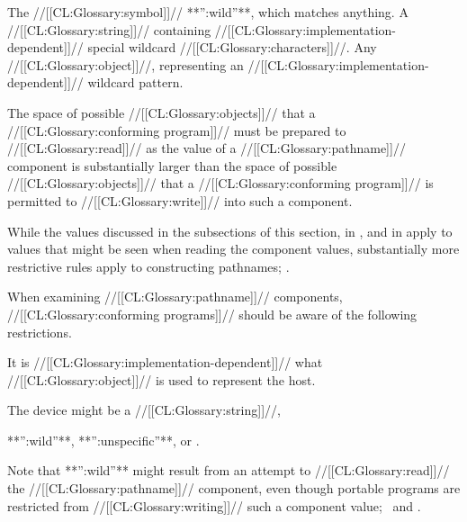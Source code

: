 \itemitem{\bull} The //[[CL:Glossary:symbol]]// **'':wild''**, which matches anything.
  \itemitem{\bull} A //[[CL:Glossary:string]]// containing //[[CL:Glossary:implementation-dependent]]//  		 special wildcard //[[CL:Glossary:characters]]//.
  \itemitem{\bull} Any //[[CL:Glossary:object]]//, 		 representing an //[[CL:Glossary:implementation-dependent]]// wildcard pattern.

\endlist 

\endsubsubsection%


   The space of possible //[[CL:Glossary:objects]]// that a //[[CL:Glossary:conforming program]]//  must be prepared to //[[CL:Glossary:read]]//  as the value of a //[[CL:Glossary:pathname]]// component is substantially larger than the space of possible //[[CL:Glossary:objects]]//  that a //[[CL:Glossary:conforming program]]// is permitted to //[[CL:Glossary:write]]// into such a component.

While the values discussed 
    in the subsections of this section,
    in {\secref\SpecialComponentValues}, and in {\secref\WildcardRestrictions}  apply to values that might be seen when  reading the component values, substantially more restrictive rules apply to constructing pathnames; \seesection\ConstructingPathnames.

When examining //[[CL:Glossary:pathname]]// components, //[[CL:Glossary:conforming programs]]// should be aware of the following restrictions.


It is //[[CL:Glossary:implementation-dependent]]// what //[[CL:Glossary:object]]// is used to represent the host. 

\endsubsubsubsection%


The device might be a //[[CL:Glossary:string]]//,

**'':wild''**, **'':unspecific''**, or \nil.

Note that **'':wild''** might result from an attempt to //[[CL:Glossary:read]]// the //[[CL:Glossary:pathname]]// component, even though portable programs are restricted from //[[CL:Glossary:writing]]// such a component value;  \seesection\WildcardRestrictions\ and \secref\ConstructingPathnames.

